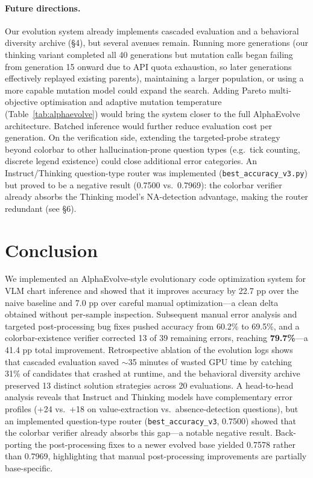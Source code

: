 \documentclass{article}
\begin{document}
\paragraph{Future directions.}
Our evolution system already implements cascaded evaluation and a behavioral
diversity archive (\S4), but several avenues remain. Running more generations
(our thinking variant completed all 40 generations but mutation calls began
failing from generation 15 onward due to API quota exhaustion, so later
generations effectively replayed existing parents),
maintaining a larger population, or using a more capable mutation model could
expand the search. Adding Pareto multi-objective optimisation and adaptive
mutation temperature (Table~\ref{tab:alphaevolve}) would bring the system
closer to the full AlphaEvolve architecture.  Batched inference would further reduce evaluation cost per
generation. On the verification side, extending the targeted-probe strategy
beyond colorbar to other hallucination-prone question types (e.g.\ tick
counting, discrete legend existence) could close additional error categories.
An Instruct/Thinking question-type router was implemented
(\texttt{best\_accuracy\_v3.py}) but proved to be a negative result
(0.7500 vs.\ 0.7969): the colorbar verifier already absorbs the Thinking
model's NA-detection advantage, making the router redundant (see \S6).

\section{Conclusion}

We implemented an AlphaEvolve-style evolutionary code optimization system for
VLM chart inference and showed that it improves accuracy by 22.7 pp over the
naive baseline and 7.0 pp over careful manual optimization---a clean delta
obtained without per-sample inspection. Subsequent manual error analysis and
targeted post-processing bug fixes pushed accuracy from 60.2\% to 69.5\%, and
a colorbar-existence verifier corrected 13 of 39 remaining errors, reaching
\textbf{79.7\%}---a 41.4 pp total improvement. Retrospective ablation of the
evolution logs shows that cascaded evaluation saved $\sim$35 minutes of wasted
GPU time by catching 31\% of candidates that crashed at runtime, and the
behavioral diversity archive preserved 13 distinct solution strategies across
20 evaluations.  A head-to-head analysis reveals that Instruct and Thinking
models have complementary error profiles (+24 vs.\ +18 on value-extraction
vs.\ absence-detection questions), but an implemented question-type router
(\texttt{best\_accuracy\_v3}, 0.7500) showed that the colorbar verifier
already absorbs this gap---a notable negative result.  Back-porting the post-processing fixes to a newer evolved
base yielded 0.7578 rather than 0.7969, highlighting that manual
post-processing improvements are partially base-specific.
\end{document}
